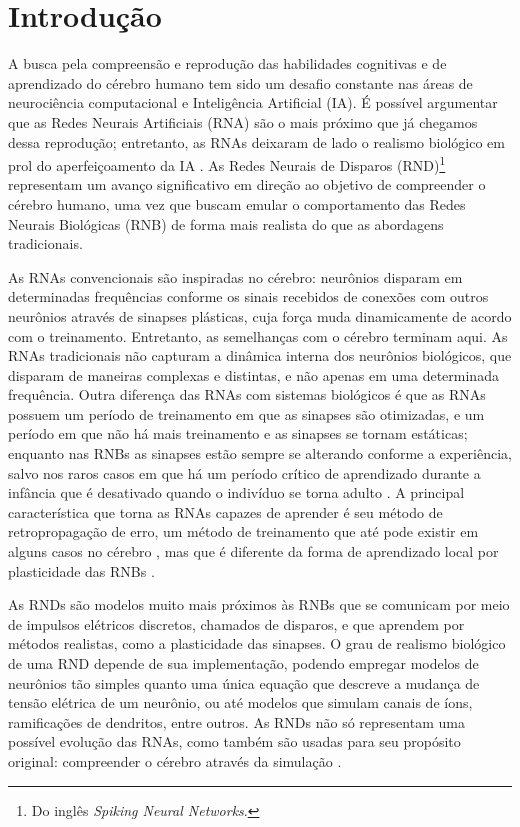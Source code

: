 \chapter{Introdução}

A busca pela compreensão e reprodução das habilidades cognitivas e de aprendizado do cérebro humano tem sido um desafio constante
nas áreas de neurociência computacional e Inteligência Artificial (IA). É possível argumentar que as Redes Neurais Artificiais
(RNA) são o mais próximo que já chegamos dessa reprodução; entretanto, as RNAs deixaram de lado o realismo biológico em prol do
aperfeiçoamento da IA \cite{yamazakiSpiking2022}. As Redes Neurais de Disparos (RND)\footnote{Do inglês \textit{Spiking Neural
Networks}.} representam um avanço significativo em direção ao objetivo de compreender o cérebro humano, uma vez que buscam emular
o comportamento das Redes Neurais Biológicas (RNB) de forma mais realista do que as abordagens tradicionais.

As RNAs convencionais são inspiradas no cérebro: neurônios disparam em determinadas frequências conforme os sinais recebidos de
conexões com outros neurônios através de sinapses plásticas, cuja força muda dinamicamente de acordo com o treinamento.
Entretanto, as semelhanças com o cérebro terminam aqui. As RNAs tradicionais não capturam a dinâmica interna dos neurônios
biológicos, que disparam de maneiras complexas e distintas, e não apenas em uma determinada frequência. Outra diferença das RNAs
com sistemas biológicos é que as RNAs possuem um período de treinamento em que as sinapses são otimizadas, e um período em que não
há mais treinamento e as sinapses se tornam estáticas; enquanto nas RNBs as sinapses estão sempre se alterando conforme a
experiência, salvo nos raros casos em que há um período crítico de aprendizado durante a infância que é desativado quando o
indivíduo se torna adulto \cite{crepelRegression1982}. A principal característica que torna as RNAs capazes de aprender é seu
método de retropropagação de erro, um método de treinamento que até pode existir em alguns casos no cérebro
\cite{lillicrapBackpropagation2020; songCan2020}, mas que é diferente da forma de aprendizado local por plasticidade das
RNBs \cite{yamazakiSpiking2022}.

As RNDs são modelos muito mais próximos às RNBs que se comunicam por meio de impulsos elétricos discretos, chamados de disparos, e
que aprendem por métodos realistas, como a plasticidade das sinapses. O grau de realismo biológico de uma RND depende de sua
implementação, podendo empregar modelos de neurônios tão simples quanto uma única equação que descreve a mudança de tensão
elétrica de um neurônio\cite{burkitt2006review}, ou até modelos que simulam canais de íons\cite{hodgkinQuantitative1952},
ramificações de dendritos\cite{pagkalosIntroducing2023}, entre outros. As RNDs não só representam uma possível evolução das RNAs,
como também são usadas para seu propósito original: compreender o cérebro através da simulação \cite{}.

